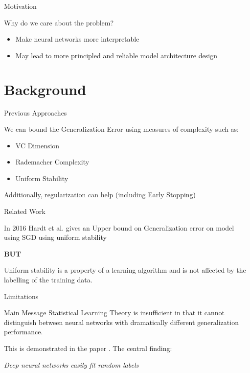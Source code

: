 \documentclass[10pt]{beamer}
\begin{document}
\begin{frame}{Motivation}
\begin{center}
	Why do we care about the problem?
\end{center}
\begin{itemize}
	\item Make neural networks more interpretable
	\item May lead to more principled and reliable model architecture design
\end{itemize}


\end{frame}	

\section{Background}

\begin{frame}{Previous Approaches}
	
We can bound the Generalization Error using measures of complexity such as:
\begin{itemize}
	\item VC Dimension 
	\item Rademacher Complexity
	\item Uniform Stability
\end{itemize}
Additionally, regularization can help (including Early Stopping)
\end{frame}	

\begin{frame}{Related Work}

In 2016 Hardt et al. gives an Upper bound on Generalization error on model using SGD using uniform stability \cite{DBLP:journals/corr/HardtRS15}

\textbf{BUT}

Uniform stability is a property of a learning algorithm and is not affected by the labelling of the training data.

\end{frame}

\begin{frame}{Limitations}
\begin{alertblock}{Main Message}
	Statistical Learning Theory is insufficient in that it cannot distinguish between neural networks with dramatically different generalization performance.
\end{alertblock}

This is demonstrated in the paper \cite{DBLP:journals/corr/ZhangBHRV16}. The central finding:

\begin{center}
	\emph{Deep neural networks easily fit random labels}
\end{center}

\end{frame}	
\end{document}
